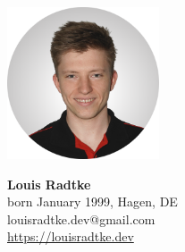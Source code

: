 \documentclass[a4paper,11pt]{article}
\newcommand{\col}[2]{\textcolor[HTML]{#1}{#2}}
\begin{document}
\begin{minipage}[t]{0.3106\textwidth}
    \vspace{-26.92cm}
    \begin{center}
        \includegraphics[width=4.5cm,clip]{profile.png}
    \end{center}

    \vspace{2.15cm}
    \begin{center}
    \begin{minipage}{0.72\textwidth}
        \huge\textbf{Louis Radtke}\\
        \scriptsize born January 1999, Hagen, DE\\
        louisradtke.dev@gmail.com\\
        \url{https://louisradtke.dev}
    \end{minipage}
    \end{center}


\end{minipage}
\hfill
\end{document}
